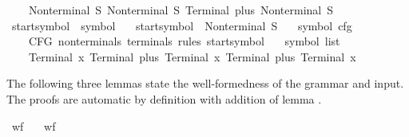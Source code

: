\begin{isabellebody}
\ \ \ \ {\isacharparenleft}{\kern0pt}Nonterminal\ S{\isacharcomma}{\kern0pt}\ {\isacharbrackleft}{\kern0pt}Nonterminal\ S{\isacharcomma}{\kern0pt}\ Terminal\ plus{\isacharcomma}{\kern0pt}\ Nonterminal\ S{\isacharbrackright}{\kern0pt}{\isacharparenright}{\kern0pt}{\isacharbrackright}{\kern0pt}{\isachardoublequoteclose}\isanewline
\isanewline
{}\isamarkupfalse%
\ start{\isacharunderscore}{\kern0pt}symbol\ {\isacharcolon}{\kern0pt}{\isacharcolon}{\kern0pt}\ symbol\ \isanewline
\ \ {\isachardoublequoteopen}start{\isacharunderscore}{\kern0pt}symbol\ {\isacharequal}{\kern0pt}\ Nonterminal\ S{\isachardoublequoteclose}\isanewline
\isanewline
{}\isamarkupfalse%
\ {\isasymG}\ {\isacharcolon}{\kern0pt}{\isacharcolon}{\kern0pt}\ {\isachardoublequoteopen}symbol\ cfg{\isachardoublequoteclose}\ \isanewline
\ \ {\isachardoublequoteopen}{\isasymG}\ {\isacharequal}{\kern0pt}\ CFG\ nonterminals\ terminals\ rules\ start{\isacharunderscore}{\kern0pt}symbol{\isachardoublequoteclose}\isanewline
\isanewline
{}\isamarkupfalse%
\ {\isasymomega}\ {\isacharcolon}{\kern0pt}{\isacharcolon}{\kern0pt}\ {\isachardoublequoteopen}symbol\ list{\isachardoublequoteclose}\ \isanewline
\ \ {\isachardoublequoteopen}{\isasymomega}\ {\isacharequal}{\kern0pt}\ {\isacharbrackleft}{\kern0pt}Terminal\ x{\isacharcomma}{\kern0pt}\ Terminal\ plus{\isacharcomma}{\kern0pt}\ Terminal\ x{\isacharcomma}{\kern0pt}\ Terminal\ plus{\isacharcomma}{\kern0pt}\ Terminal\ x{\isacharbrackright}{\kern0pt}{\isachardoublequoteclose}%
\begin{isamarkuptext}%
The following three lemmas state the well-formedness of the grammar and input. The proofs are automatic
by definition with addition of lemma .%
\end{isamarkuptext}\isamarkuptrue%
\isamarkupfalse%
\ wf{\isacharunderscore}{\kern0pt}{\isasymG}{\isacharcolon}{\kern0pt}\isanewline
\ \ \ {\isachardoublequoteopen}wf{\isacharunderscore}{\kern0pt}{\isasymG}\ {\isasymG}{\isachardoublequoteclose}%
\isadelimproof
%
\endisadelimproof
%
\isatagproof
%
\endisatagproof
{\isafoldproof}%
%
\isadelimproof
%
\endisadelimproof
%
\begin{isamarkuptext}%
%
\end{isamarkuptext}\isamarkuptrue%
\isamarkupfalse%

\end{isabellebody}

